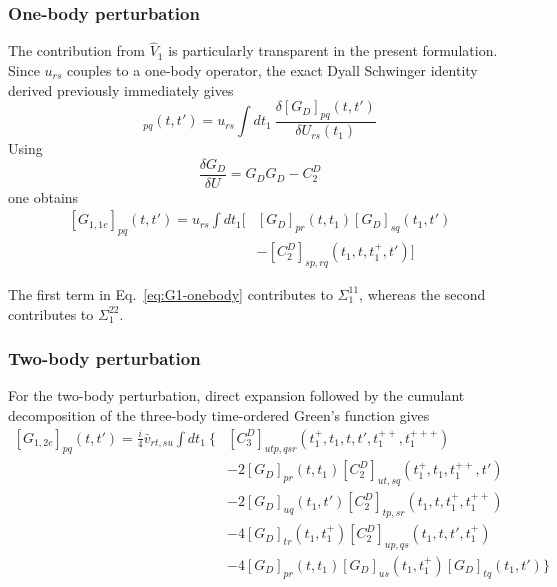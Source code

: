 \documentclass[aip,jcp,reprint,noshowkeys,superscriptaddress]{revtex4-1}
\begin{document}
\subsubsection{One-body perturbation}

The contribution from $\hat V_1$ is particularly transparent in the
present formulation.  Since $u_{rs}$ couples to a one-body operator,
the exact Dyall Schwinger identity derived previously immediately gives
\begin{equation}
  [G_{1,1e}]_{pq}(t,t')
  =
  u_{rs}
  \int dt_1\
  \frac{
    \delta[G_D]_{pq}(t,t')
  }{
    \delta U_{rs}(t_1)
  }
\end{equation}
Using
\begin{equation}
  \frac{\delta G_D}{\delta U}
  =
  G_DG_D-C_2^D
\end{equation}
one obtains
\begin{equation}
  \begin{aligned}
  [G_{1,1e}]_{pq}(t,t')
  =
  u_{rs}
  \int dt_1
  \Big[
  &
  [G_D]_{pr}(t,t_1)
  [G_D]_{sq}(t_1,t')
  \\
  &
  -
  [C_2^D]_{sp,rq}
  (t_1,t,t_1^+,t')
  \Big]
  \end{aligned}
  \label{eq:G1-onebody}
\end{equation}

The first term in Eq.~\eqref{eq:G1-onebody} contributes to
$\Sigma_1^{11}$, whereas the second contributes to
$\Sigma_1^{22}$.


\subsubsection{Two-body perturbation}

For the two-body perturbation, direct expansion followed by the
cumulant decomposition of the three-body time-ordered Green's function
gives
\begin{equation}
  \begin{aligned}
  [G_{1,2e}]_{pq}(t,t')
  =
  \frac{i}{4}
  \bar v_{rt,su}
  \int dt_1\
  \Big\{
  &
  [C_3^D]_{utp,qsr}
  (t_1^+,t_1,t,t',t_1^{++},t_1^{+++})
  \\[1mm]
  &
  -2
  [G_D]_{pr}(t,t_1)
  [C_2^D]_{ut,sq}
  (t_1^+,t_1,t_1^{++},t')
  \\[1mm]
  &
  -2
  [G_D]_{uq}(t_1,t')
  [C_2^D]_{tp,sr}
  (t_1,t,t_1^+,t_1^{++})
  \\[1mm]
  &
  -4
  [G_D]_{tr}(t_1,t_1^+)
  [C_2^D]_{up,qs}
  (t_1,t,t',t_1^+)
  \\[1mm]
  &
  -4
  [G_D]_{pr}(t,t_1)
  [G_D]_{us}(t_1,t_1^+)
  [G_D]_{tq}(t_1,t')
  \Big\}
  \end{aligned}
  \label{eq:G1-twobody}
\end{equation}
\end{document}
